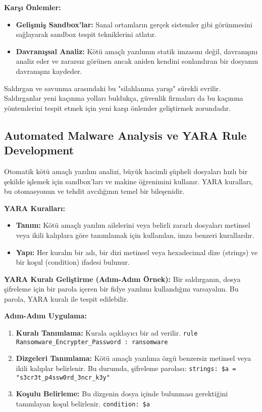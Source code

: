 \textbf{Karşı Önlemler:}
\begin{itemize}
    \item \textbf{Gelişmiş Sandbox'lar:} Sanal ortamların gerçek sistemler gibi görünmesini sağlayarak sandbox tespit tekniklerini atlatır.
    \item \textbf{Davranışsal Analiz:} Kötü amaçlı yazılımın statik imzasını değil, davranışını analiz eder ve zararsız görünen ancak aniden kendini sonlandıran bir dosyanın davranışını kaydeder.
\end{itemize}

Saldırgan ve savunma arasındaki bu "silahlanma yarışı" sürekli evrilir. Saldırganlar yeni kaçınma yolları buldukça, güvenlik firmaları da bu kaçınma yöntemlerini tespit etmek için yeni karşı önlemler geliştirmek zorundadır.

\subsection{Automated Malware Analysis ve YARA Rule Development}

Otomatik kötü amaçlı yazılım analizi, büyük hacimli şüpheli dosyaları hızlı bir şekilde işlemek için sandbox'ları ve makine öğrenimini kullanır. YARA kuralları, bu otomasyonun ve tehdit avcılığının temel bir bileşenidir.

\textbf{YARA Kuralları:}
\begin{itemize}
    \item \textbf{Tanım:} Kötü amaçlı yazılım ailelerini veya belirli zararlı dosyaları metinsel veya ikili kalıplara göre tanımlamak için kullanılan, imza benzeri kurallardır.
    \item \textbf{Yapı:} Her kuralın bir adı, bir dizi metinsel veya hexadecimal dize (strings) ve bir koşul (condition) ifadesi bulunur.
\end{itemize}

\textbf{YARA Kuralı Geliştirme (Adım-Adım Örnek):}
Bir saldırganın, dosya şifreleme için bir parola içeren bir fidye yazılımı kullandığını varsayalım. Bu parola, YARA kuralı ile tespit edilebilir.

\textbf{Adım-Adım Uygulama:}
\begin{enumerate}
    \item \textbf{Kuralı Tanımlama:} Kurala açıklayıcı bir ad verilir. \texttt{rule Ransomware\_Encrypter\_Password : ransomware}
    \item \textbf{Dizgeleri Tanımlama:} Kötü amaçlı yazılıma özgü benzersiz metinsel veya ikili kalıplar belirlenir. Bu durumda, şifreleme parolası: \texttt{strings: \$a = "s3cr3t\_p4ssw0rd\_3ncr\_k3y"}
    \item \textbf{Koşulu Belirleme:} Bu dizgenin dosya içinde bulunması gerektiğini tanımlayan koşul belirlenir. \texttt{condition: \$a}
\end{enumerate}

